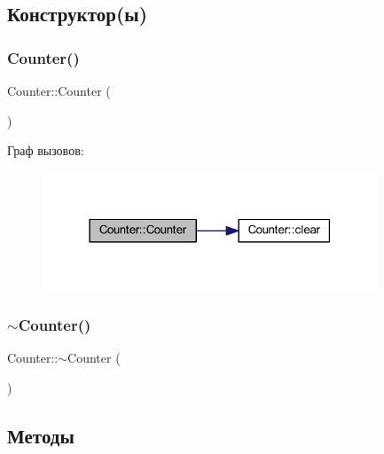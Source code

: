 \subsection{Конструктор(ы)}
\hypertarget{class_counter_a1e05f69b5240fbab3e7ab351672167f0}{}\label{class_counter_a1e05f69b5240fbab3e7ab351672167f0} 
\subsubsection{\texorpdfstring{Counter()}{Counter()}}
{\footnotesize\ttfamily Counter\+::\+Counter (\begin{DoxyParamCaption}{ }\end{DoxyParamCaption})}

Граф вызовов\+:\nopagebreak
\begin{figure}[H]
\begin{center}
\leavevmode
\includegraphics[width=283pt]{class_counter_a1e05f69b5240fbab3e7ab351672167f0_cgraph}
\end{center}
\end{figure}
\hypertarget{class_counter_a97f4728470ae8eff37d50ef1d6bb0135}{}\label{class_counter_a97f4728470ae8eff37d50ef1d6bb0135} 
\subsubsection{\texorpdfstring{$\sim$\+Counter()}{~Counter()}}
{\footnotesize\ttfamily Counter\+::$\sim$\+Counter (\begin{DoxyParamCaption}{ }\end{DoxyParamCaption})}



\subsection{Методы}
\hypertarget{class_counter_af66c74ac2bc69fa4f30c34377f869596}{}\label{class_counter_af66c74ac2bc69fa4f30c34377f869596} 
